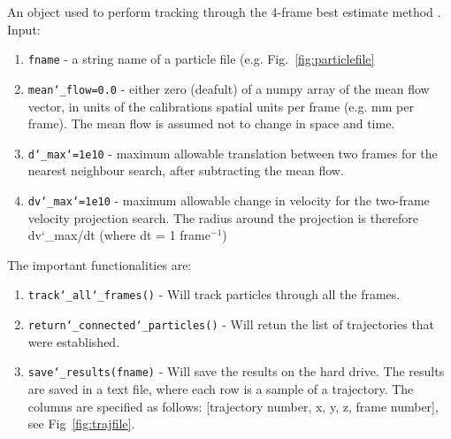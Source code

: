\documentclass[10pt,a4paper]{article}
\begin{document}
An object used to perform tracking through the 4-frame best estimate method \cite{Ouellette2006}. Input:
%
\begin{enumerate}
	\item \texttt{fname} - a string name of a particle file (e.g. Fig.~\ref{fig:particlefile}
	\item \texttt{mean\char`_flow=0.0} - either zero (deafult) of a numpy array of the mean flow vector, in units of the calibrations spatial units per frame (e.g. mm per frame). The mean flow is assumed not to change in space and time.
	\item \texttt{d\char`_max\char`=1e10} - maximum allowable translation between two frames for the nearest neighbour search, after subtracting the mean flow. 
	\item \texttt{dv\char`_max\char`=1e10} - maximum allowable change in velocity for the two-frame velocity projection search. The radius around the projection is therefore dv\char`_max/dt (where dt = 1 frame$^{-1}$)
\end{enumerate}


The important functionalities are:
%
\begin{enumerate}
	\item \texttt{track\char`_all\char`_frames()} - Will track particles through all the frames. 
	
	\item \texttt{return\char`_connected\char`_particles()} - Will retun the list of trajectories that were established.
	
	\item \texttt{save\char`_results(fname)} - Will save the results on the hard drive. The results are saved in a text file, where each row is a sample of a trajectory. The columns are specified as follows: [trajectory number, x, y, z, frame number], see Fig~\ref{fig:trajfile}.  
\end{enumerate}
\end{document}
